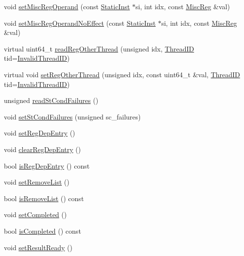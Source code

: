 \begin{DoxyCompactItemize}
\item 
void \hyperlink{classInOrderDynInst_a6cfad8f780bab7feb893941cb0d46160}{setMiscRegOperand} (const \hyperlink{classStaticInst}{StaticInst} $\ast$si, int idx, const \hyperlink{classInOrderDynInst_aaf5f073a387db0556d1db4bcc45428bc}{MiscReg} \&val)
\item 
void \hyperlink{classInOrderDynInst_ab8932cf05609c698879f7ed97c0e1afa}{setMiscRegOperandNoEffect} (const \hyperlink{classStaticInst}{StaticInst} $\ast$si, int idx, const \hyperlink{classInOrderDynInst_aaf5f073a387db0556d1db4bcc45428bc}{MiscReg} \&val)
\item 
virtual uint64\_\-t \hyperlink{classInOrderDynInst_a7aec440eccd01d839eee542413204f12}{readRegOtherThread} (unsigned idx, \hyperlink{base_2types_8hh_ab39b1a4f9dad884694c7a74ed69e6a6b}{ThreadID} tid=\hyperlink{base_2types_8hh_a192b210a26f038691d0f095d85dc0953}{InvalidThreadID})
\item 
virtual void \hyperlink{classInOrderDynInst_a29b9290161684b20a1b45773925c8461}{setRegOtherThread} (unsigned idx, const uint64\_\-t \&val, \hyperlink{base_2types_8hh_ab39b1a4f9dad884694c7a74ed69e6a6b}{ThreadID} tid=\hyperlink{base_2types_8hh_a192b210a26f038691d0f095d85dc0953}{InvalidThreadID})
\item 
unsigned \hyperlink{classInOrderDynInst_a25b995a791e41965e088d8bf3f2bf859}{readStCondFailures} ()
\item 
void \hyperlink{classInOrderDynInst_abbe779fa43c72cd485ddb736ab17ff61}{setStCondFailures} (unsigned sc\_\-failures)
\item 
void \hyperlink{classInOrderDynInst_a662e013e969f1fc19006a1b479769c2c}{setRegDepEntry} ()
\item 
void \hyperlink{classInOrderDynInst_a51fbbc66353e7afa079def436e3e749d}{clearRegDepEntry} ()
\item 
bool \hyperlink{classInOrderDynInst_a5eabba98d39e59f5b8a9435e70dd1c37}{isRegDepEntry} () const 
\item 
void \hyperlink{classInOrderDynInst_a6e2744311cfd76cdb12b88141528e668}{setRemoveList} ()
\item 
bool \hyperlink{classInOrderDynInst_a646333640def0ac5f7aa5e9cf300bf86}{isRemoveList} () const 
\item 
void \hyperlink{classInOrderDynInst_a3241c8bad3d5ddb517721b999a4e3670}{setCompleted} ()
\item 
bool \hyperlink{classInOrderDynInst_a9065f06f69273b51a799acff12d2c4c7}{isCompleted} () const 
\item 
void \hyperlink{classInOrderDynInst_a142437d4d0962c5b61960661f5141891}{setResultReady} ()

\end{DoxyCompactItemize}
